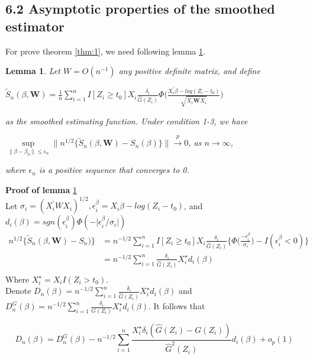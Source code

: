 \documentclass[12pt]{article}
\newtheorem{lemma}[theorem]{Lemma}
\begin{document}
	\subsection{6.2 Asymptotic properties of the smoothed estimator}
	\noindent For prove theorem \ref{thm:1}, we need following lemma \ref{lemma:1}.\\
	
	\begin{lemma} \label{lemma:1}
		Let $ W=O(n^{-1})$ any positive definite matrix, and define
		\begin{center}
			$\tilde{S}_n(\beta, \textbf{W})=\frac{1}{n} \sum_{i=1}^{n} I[Z_i \geq t_0] X_i \frac{\delta_i}{\hat{G}(Z_i)}\Phi\Big(\frac{X_i^\prime\beta-log(Z_i-t_0)}{\sqrt{X_i^{\prime} \textbf{W}X_{i}}}\Big)$
		\end{center}
		as the smoothed estimating function. Under condition 1-3, we have
		\begin{center}
			$\sup\limits_{\lVert \beta - \beta_0 \rVert \leq \epsilon_n} \lVert {n^{1/2}} \{ \tilde{S}_n(\beta, \textbf{W})-S_n(\beta) \} \rVert \xrightarrow{p} 0$, as $n\to\infty$,		
		\end{center}
		where ${\epsilon_n}$ is a positive sequence that converges to 0.
	\end{lemma}

	\noindent \textbf{Proof of lemma} \ref{lemma:1}\\
	Let $\sigma_i=(X_i^\prime W X_i)^{1/2}, \epsilon_i^\beta=X_i\beta-log(Z_i-t_0)$, and $d_i(\beta)=sgn(\epsilon_i^\beta)\Phi(-\lvert\epsilon_i^\beta/\sigma_i\rvert)$\\
	\begin{align*}
	n^{1/2}\{ \tilde{S}_n(\beta, \textbf{W})-S_n)\} & = n^{-1/2} \sum_{i=1}^{n}I[Z_i \geq t_0] X_i \frac{\delta_i}{\hat{G}(Z_i)}\bigg\{ \Phi \bigg(\frac{-\epsilon_i^\beta}{\sigma_i}\bigg)-I(\epsilon_i^\beta<0) \bigg\}\\
	& = n^{-1/2} \sum_{i=1}^{n} \frac{\delta_i}{\hat{G}(Z_i)} X_i^\star d_i(\beta)\\
	\end{align*}
	\noindent Where $X_i^\star = X_i I(Z_i>t_0)$.\\
	
	\noindent Denote $D_n(\beta)=n^{-1/2} \sum_{i=1}^{n}\frac{\delta_i}{\hat{G}(Z_i)} X_i^\star d_i(\beta)$ and $D_n^G(\beta)=n^{-1/2} \sum_{i=1}^{n} \frac{\delta_i}{G(Z_i)} X_i^\star d_i(\beta)$. It follows that
	
	\begin{equation} \label{eq:8}
	D_n(\beta)=D_n^G(\beta)-n^{-1/2} \sum_{i=1}^{n}\frac{X_i^\star\delta_i(\hat{G}(Z_i)-G(Z_i))}{\hat{G}^2(Z_i)}d_i(\beta)+o_p(1)
	\end{equation}
	
\end{document}
